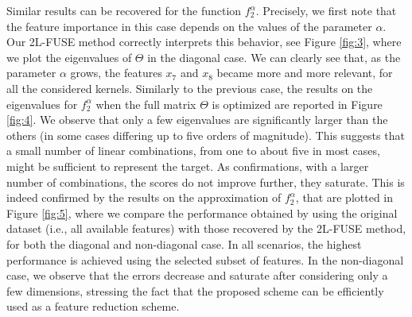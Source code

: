 \documentclass[hyphens,a4paper,11pt]{article}
\newcommand{\mTheta}{\mathsf{\Theta}}
\begin{document}
Similar results can be recovered for the function $f_2^\alpha$. Precisely, we first note that the feature importance in this case depends on the values of the parameter $\alpha$. Our 2L-FUSE method correctly interprets this behavior, see Figure \ref{fig:3}, where we plot the eigenvalues of $\mTheta$ in the diagonal case. We can clearly see that, as the parameter $\alpha$ grows, the features $x_7$ and $x_8$ became more and more relevant, for all the considered kernels. Similarly to the previous case, the results on the eigenvalues for $f_2^\alpha$ when the full matrix $\mTheta$ is optimized are reported in Figure \ref{fig:4}. We observe that only a few eigenvalues are significantly larger than the others (in some cases differing up to five orders of magnitude). This suggests that a small number of linear combinations, from one to about five in most cases, might be sufficient to represent the target. As confirmations, with a larger number of combinations, the scores do not improve further, they saturate. This is indeed confirmed by the results on the approximation of \(f_2^\alpha\), that are plotted in Figure \ref{fig:5}, where we  compare the performance obtained by using the original dataset (i.e., all available features) with those recovered by the 2L-FUSE method, for both the diagonal and non-diagonal case. In all scenarios, the highest performance is achieved using the selected subset of features. In the non-diagonal case, we observe that the errors decrease and saturate after considering only a few dimensions, stressing the fact that the proposed scheme can be efficiently used as a feature reduction scheme. 
\end{document}
